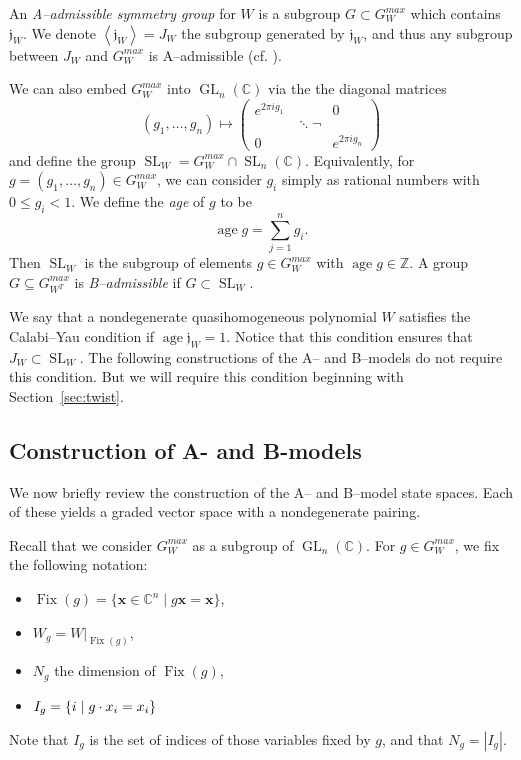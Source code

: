 \documentclass[10pt, letterpaper]{amsart}
\theoremstyle{remark}
\newcommand{\CC}{\mathbb C}
\newcommand{\ZZ}{\mathbb{Z}}
\newcommand{\jw}{\mathfrak{j}}
\newcommand{\set}[1]{\{#1\}}
\newcommand{\defital}{\textit}
\newcommand{\mb}[1]{\mathbf{#1}}
\DeclareMathOperator{\SL}{SL}
\DeclareMathOperator{\GL}{GL}
\DeclareMathOperator{\Fix}{Fix}
\DeclareMathOperator{\age}{age}
\begin{document}
An \defital{A--admissible symmetry group} for $W$ is a subgroup $G\subset G_W^{max}$ which contains $\jw_W$.   We denote $\left\langle \jw_W\right> = J_W$ the subgroup generated by $\jw_W$, and thus any subgroup between $J_W$ and $G_W^{max}$ is A--admissible (cf. \cite{Kr}). 

We can also embed $G_W^{max}$ into $\GL_n(\CC)$ via the the diagonal matrices
\[
(g_1,\dots,g_n)\mapsto \left(\begin{matrix}
                              e^{2\pi i g_1} & & 0 \\
			      & \ddots ¬ \\
			      0& & e^{2\pi i g_n}
                             \end{matrix}
 \right) 
\]
and define the group $\SL_W=G_W^{max}\cap \SL_n(\CC)$. Equivalently, for $g=(g_1,\dots,g_n)\in G^{max}_W$, we can consider $g_i$ simply as rational numbers with $0\leq g_i< 1$. We define the \emph{age} of $g$ to be 
\[
 \age g = \sum_{j=1}^n g_i. 
\]
Then $\SL_W$ is the subgroup of elements $g\in G^{max}_W$ with $\age g\in \ZZ$. A group $G\subseteq G^{max}_{W^T}$ is \emph{B--admissible} if $G\subset \SL_W$.

We say that a nondegenerate quasihomogeneous polynomial $W$ satisfies the Calabi--Yau condition if $\age \jw_W=1$. Notice that this condition ensures that $J_W\subset \SL_W$. The following constructions of the A-- and B--models do not require this condition. But we will require this condition beginning with Section~\ref{sec:twist}. 


\subsection{Construction of A- and B-models}
We now briefly review the construction of the A-- and B--model state spaces. Each of these yields a graded vector space with a nondegenerate pairing.

Recall that we consider $G^{max}_W$ as a subgroup of $\GL_n(\CC)$. For $g\in G^{max}_W$, we fix the following notation:
\begin{itemize}
\item $\Fix(g)=\set{ \mb{x}\in \CC^n\mid g\mb{x}=\mb{x}}$, 
\item $W_g=W|_{\Fix(g)}$, 
\item $N_g$ the dimension of $\Fix(g)$,
\item $I_g = \{i \hspace{.1cm} |\hspace{.1cm}  g \cdot x_i = x_i\}$ 
\end{itemize}
Note that $I_g$ is the set of indices of those variables fixed by $g$, and that $N_g=|I_g|$.
\end{document}
